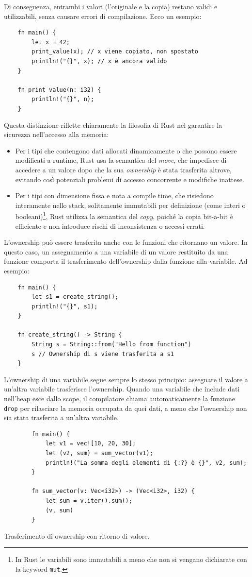 Di conseguenza, entrambi i valori (l'originale e la copia) restano validi e utilizzabili, senza causare errori di compilazione. Ecco un esempio:
\begin{verbatim}
    fn main() {
        let x = 42;
        print_value(x); // x viene copiato, non spostato
        println!("{}", x); // x è ancora valido
    }

    fn print_value(n: i32) {
        println!("{}", n);
    }
\end{verbatim}
Questa distinzione riflette chiaramente la filosofia di Rust nel garantire la sicurezza nell'accesso alla memoria:
\begin{itemize}
    \item Per i tipi che contengono dati allocati dinamicamente o che possono essere modificati a runtime, Rust usa la semantica del \textit{move}, che impedisce di accedere a un valore dopo che la sua \textit{ownership} è stata trasferita altrove, evitando così potenziali problemi di accesso concorrente e modifiche inattese.
    \item Per i tipi con dimensione fissa e nota a compile time, che risiedono interamente nello stack, solitamente immutabili per definizione (come interi o booleani)\footnote{In Rust le variabili sono immutabili a meno che non si vengano dichiarate con la keyword \texttt{mut}.}, Rust utilizza la semantica del \textit{copy}, poiché la copia bit-a-bit è efficiente e non introduce rischi di inconsistenza o accessi errati.
\end{itemize}
L'ownership può essere trasferita anche con le funzioni che ritornano un valore. In questo caso, un assegnamento a una variabile di un valore restituito da una funzione comporta il trasferimento dell'ownership dalla funzione alla variabile. Ad esempio:
\begin{verbatim}
    fn main() {
        let s1 = create_string(); 
        println!("{}", s1);
    }

    fn create_string() -> String {
        String s = String::from("Hello from function")
        s // Ownership di s viene trasferita a s1
    }
\end{verbatim}
L'ownership di una variabile segue sempre lo stesso principio: assegnare il valore a un'altra variabile trasferisce l'ownership. Quando una variabile che include dati nell'heap esce dallo scope, il compilatore chiama automaticamente la funzione \texttt{drop} per rilasciare la memoria occupata da quei dati, a meno che l'ownership non sia stata trasferita a un'altra variabile.
\begin{listing}[H]
    \begin{verbatim}
        fn main() {
            let v1 = vec![10, 20, 30];
            let (v2, sum) = sum_vector(v1); 
            println!("La somma degli elementi di {:?} è {}", v2, sum);
        }

        fn sum_vector(v: Vec<i32>) -> (Vec<i32>, i32) {
            let sum = v.iter().sum();
            (v, sum)
        }
    \end{verbatim}
    \caption{Trasferimento di ownership con ritorno di valore.}
    \label{lst:ownership-return}
\end{listing}


